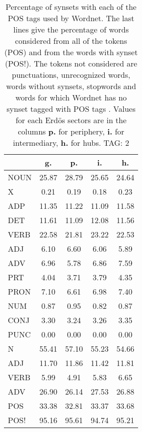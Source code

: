 \begin{table}[h!]
\begin{center}
\begin{tabular}{| l || c | c | c | c |}\hline
 & {\bf g.} & {\bf p.} & {\bf i.} & {\bf h.} \\\hline\hline
NOUN & 25.87  & 28.79  & 25.65  & 24.64 \\
X & 0.21  & 0.19  & 0.18  & 0.23 \\\hline
ADP & 11.35  & 11.22  & 11.09  & 11.58 \\
DET & 11.61  & 11.09  & 12.08  & 11.56 \\\hline
VERB & 22.58  & 21.81  & 23.22  & 22.53 \\\hline
ADJ & 6.10  & 6.60  & 6.06  & 5.89 \\
ADV & 6.96  & 5.78  & 6.86  & 7.59 \\\hline
PRT & 4.04  & 3.71  & 3.79  & 4.35 \\
PRON & 7.10  & 6.61  & 6.98  & 7.40 \\
NUM & 0.87  & 0.95  & 0.82  & 0.87 \\
CONJ & 3.30  & 3.24  & 3.26  & 3.35 \\
PUNC & 0.00  & 0.00  & 0.00  & 0.00 \\\hline\hline\hline
N & 55.41  & 57.10  & 55.23  & 54.66 \\\hline
ADJ & 11.70  & 11.86  & 11.42  & 11.81 \\\hline
VERB & 5.99  & 4.91  & 5.83  & 6.65 \\\hline
ADV & 26.90  & 26.14  & 27.53  & 26.88 \\\hline\hline
POS & 33.38  & 32.81  & 33.37  & 33.68 \\\hline
POS! & 95.16  & 95.61  & 94.74  & 95.21 \\\hline
\end{tabular}
\caption{Percentage of synsets with each of the POS tags used by Wordnet. The last lines give the percentage of words considered from all of the tokens (POS) and from the words with synset (POS!). The tokens not considered are punctuations, unrecognized words, words without synsets, stopwords and words for which Wordnet has no synset  tagged with POS tags . Values for each Erd\"os sectors are in the columns {{\bf p.}} for periphery, {{\bf i.}} for intermediary, {{\bf h.}} for hubs. TAG: 2}
\end{center}
\end{table}